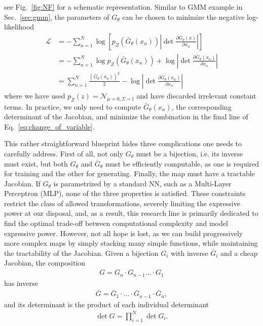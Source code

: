%
see Fig.~\ref{fig:NF} for a schematic representation. Similar to GMM example in Sec.~\ref{sec:gmm}, the parameters of $G_{\theta}$ can be chosen to minimize the negative log-likelihood
%
\begin{align}\label{eq:change_of_variable}
\mathcal{L} &= - \sum_{n=1}^N \log \left[ p_Z(\bar{G} _{\theta}(x_n)) \left|\det \frac{\partial \bar{G} _{\theta}(x)}{\partial x_n}\right| \right]\\
&= -\sum_{n=1}^N \log p_Z(\bar{G} _{\theta}(x_n)) + \log \left|\det \frac{\partial \bar{G} _{\theta}(x_n)}{\partial x_n}\right|\\
&= \sum_{n=1}^N \frac{(\bar{G} _{\theta}(x_n))^2}{2} - \log \left|\det \frac{\partial \bar{G} _{\theta}(x_n)}{\partial x_n}\right|
\end{align}
%
where we have used $p_{Z}(z) = \mathcal{N}_{\mu=0, \Sigma=\mathbb{I}}$ and have discarded irrelevant constant terms. 
In practice, we only need to compute $\bar{G} _{\theta}(x_n)$, the corresponding determinant of the Jacobian, and minimize the combination in the final line of Eq.~\ref{eq:change_of_variable}.

This rather straightforward blueprint hides three complications one needs to carefully address. First of all, not only $G_{\theta}$ must be a bijection, i.e. its inverse must exist, but both $G_{\theta}$ and $\bar{G} _{\theta}$ must be efficiently computable, as one is required for training and the other for generating. Finally, the map must have a tractable Jacobian. If $G_{\theta}$ is parametrized by a standard NN, such as a Multi-Layer Perceptron (MLP), none of the three properties is satisfied. These constraints restrict the class of allowed transformations, severely limiting the expressive power at our disposal, and, as a result, this research line is primarily dedicated to find the optimal trade-off between computational complexity and model expressive power. 
However, not all hope is lost, as we can build progressively more complex maps by simply stacking many simple functions, while maintaining the tractability of the Jacobian.
Given a bijection $G_{i}$ with inverse $\bar{G}_{i}$ and a cheap Jacobian, the composition
\begin{align}
G = G_{n} \cdot  G_{n-1} \ldots \cdot G_{1}
\end{align}
has inverse
\begin{align}
\bar{G} = \bar{G}_{1} \cdot   \ldots \cdot \bar{G}_{n-1} \cdot \bar{G}_{n},
\end{align}
and its determinant is the product of each individual determinant
\begin{align}
\det G = \prod_{i=1}^{N}  \det G_{i}.
\end{align}


